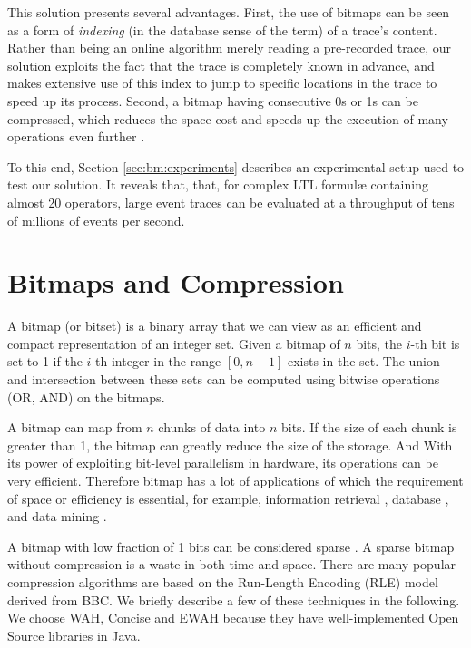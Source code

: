 This solution presents several advantages. First, the use of bitmaps can be seen as a form of \emph{indexing} (in the database sense of the term) of a trace's content. Rather than being an online algorithm merely reading a pre-recorded trace, our solution exploits the fact that the trace is completely known in advance, and makes extensive use of this index to jump to specific locations in the trace to speed up its process. Second, a bitmap having consecutive 0s or 1s can be compressed, which reduces the space cost and speeds up the execution of many operations even further \citep{lemire2014}.

To this end, Section \ref{sec:bm:experiments} describes an experimental setup used to test our solution. It reveals that, that, for complex LTL formul\ae{} containing almost 20 operators, large event traces can be evaluated at a throughput of tens of millions of events per second.


\section{Bitmaps and Compression}\label{sec:bm:compression} %

A bitmap (or bitset) is a binary array that we can view as an efficient and compact representation of an integer set. Given a bitmap of $n$ bits, the $i$-th bit is set to 1 if the $i$-th integer in the range $[0, n-1]$ exists in the set. The union and intersection between these sets can be computed using bitwise operations (OR, AND) on the bitmaps.

A bitmap can map from $n$ chunks of data into $n$ bits. If the size of each chunk is greater than 1, the bitmap can greatly reduce the size of the storage. And With its power of exploiting bit-level parallelism in hardware, its operations can be very efficient. Therefore bitmap has a lot of applications of which the requirement of space or efficiency is essential, for example, information retrieval \citep{Chan:1998:BID:276305.276336}, database \citep{burdick2001mafia}, and data mining \citep{Ayres:2002:SPM:775047.775109} \citep{Uno:2005:LVC:1133905.1133916}.

A bitmap with low fraction of 1 bits can be considered sparse \citep{lemire2014}. A sparse bitmap without compression is a waste in both time and space. There are many popular compression algorithms are based on the Run-Length Encoding (RLE) model derived from BBC\citep{antoshenkov1995byte}. We briefly describe a few of these techniques in the following.  We choose WAH\citep{wu2006optimizing}, Concise\citep{colantonio2010} and EWAH\citep{lemire2010} because they have well-implemented Open Source libraries in Java.

